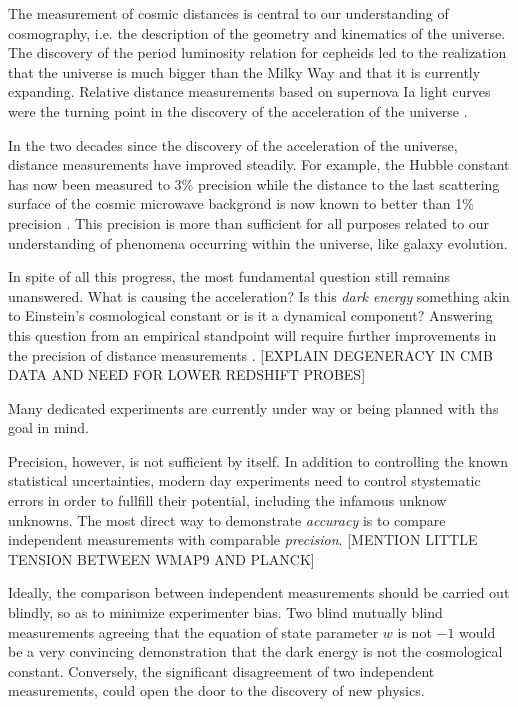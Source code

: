 The measurement of cosmic distances is central to our understanding of
cosmography, i.e. the description of the geometry and kinematics of
the universe. The discovery of the period luminosity relation for
cepheids led to the realization that the universe is much bigger than
the Milky Way and that it is currently expanding. Relative distance
measurements based on supernova Ia light curves were the turning point
in the discovery of the acceleration of the universe
\citep{Riess:1998p21184,Per++99}.

In the two decades since the discovery of the acceleration of the
universe, distance measurements have improved steadily. For example,
the Hubble constant has now been measured to 3\% precision
\citep{Rie++11,Fre++12}
while the distance to the last scattering surface of the cosmic
microwave backgrond is now known to better than 1\% precision
\cite{WMAP9,Planck15}. This precision is more than sufficient for all purposes
related to our understanding of phenomena occurring within the
universe, like galaxy evolution.

In spite of all this progress, the most fundamental question still
remains unanswered. What is causing the acceleration? Is this {\it
dark energy} something akin to Einstein's cosmological constant or is
it a dynamical component? Answering this question from an empirical
standpoint will require further improvements in the precision of
distance measurements \citep{Wei++13}.  [EXPLAIN DEGENERACY IN CMB
DATA AND NEED FOR LOWER REDSHIFT PROBES]

Many dedicated experiments are currently under way or being planned
with ths goal in mind.

Precision, however, is not sufficient by itself. In addition to
controlling the known statistical uncertainties, modern day
experiments need to control stystematic errors in order to fullfill
their potential, including the infamous unknow unknowns. The most
direct way to demonstrate {\it accuracy} is to compare independent
measurements with comparable {\it precision}. [MENTION LITTLE TENSION
BETWEEN WMAP9 AND PLANCK]

Ideally, the comparison between independent measurements should be
carried out blindly, so as to minimize experimenter bias. Two blind
mutually blind measurements agreeing that the equation of state
parameter $w$ is not $-1$ would be a very convincing demonstration
that the dark energy is not the cosmological constant. Conversely, the
significant disagreement of two independent measurements, could open
the door to the discovery of new physics.

